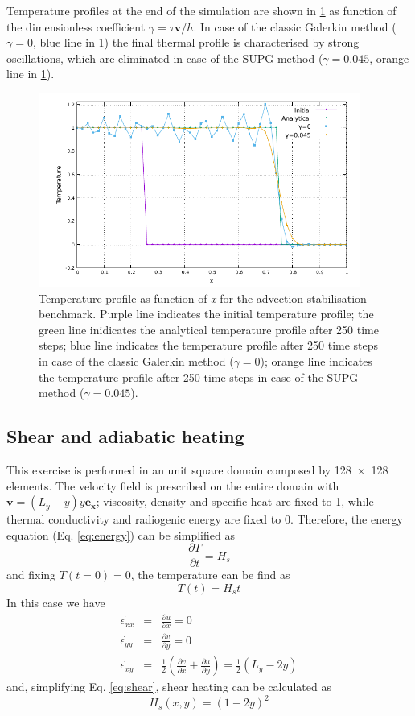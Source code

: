 \documentclass[hidelinks,11pt,a4paper]{article}
\begin{document}
Temperature profiles at the end of the simulation are shown in \ref{fig:advection} as function of the dimensionless coefficient $\gamma=\tau \bm{v}/h$. In case of the classic Galerkin method ($\gamma=0$, blue line in \ref{fig:advection}) the final thermal profile is characterised by strong oscillations, which are eliminated in case of the SUPG method ($\gamma=0.045$, orange line in \ref{fig:advection}).

\begin{figure}
\centering
\noindent\includegraphics[width=400px]{./Figures/Advection.pdf}
\caption{Temperature profile as function of \textit{x} for the advection stabilisation benchmark. Purple line indicates the initial temperature profile; the green line inidicates the analytical temperature profile after 250 time steps; blue line indicates the temperature profile after 250 time steps in case of the classic Galerkin method ($\gamma=0$); orange line indicates the temperature profile after 250 time steps in case of the SUPG method ($\gamma=0.045$).}
\label{fig:advection}
\end{figure}

\subsection{Shear and adiabatic heating}\label{sec:simple_shear}
This exercise is performed in an unit square domain composed by \num{128x128} elements. The velocity field is prescribed on the entire domain with $\bm{v}=(L_y-y)y\bm{e_x}$; viscosity, density and specific heat are fixed to 1, while thermal conductivity and radiogenic energy are fixed to 0. Therefore, the energy equation (Eq. \ref{eq:energy}) can be simplified as \[\frac{\partial T}{\partial t}=H_s\] and fixing $T(t=0)=0$, the temperature can be find as \[T(t)=H_s t\]
In this case we have
\begin{eqnarray}
\dot{\epsilon_{xx}}&=&\frac{\partial u}{\partial x}=0 \nonumber \\
\dot{\epsilon_{yy}}&=&\frac{\partial v}{\partial y}=0 \nonumber \\
\dot{\epsilon_{xy}}&=&\frac{1}{2}\left(\frac{\partial v}{\partial x}+\frac{\partial u}{\partial y}\right)=\frac{1}{2}(L_y-2y)\nonumber
\end{eqnarray}
and, simplifying Eq. \ref{eq:shear}, shear heating can be calculated as \[H_s(x,y)=(1-2y)^2\]
\end{document}
